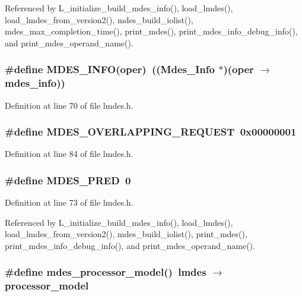 Referenced by L\_\-initialize\_\-build\_\-mdes\_\-info(), load\_\-lmdes(), load\_\-lmdes\_\-from\_\-version2(), mdes\_\-build\_\-iolist(), mdes\_\-max\_\-completion\_\-time(), print\_\-mdes(), print\_\-mdes\_\-info\_\-debug\_\-info(), and print\_\-mdes\_\-operand\_\-name().
\subsubsection{\setlength{\rightskip}{0pt plus 5cm}\#define MDES\_\-INFO(oper)~((\bf{Mdes\_\-Info} $\ast$)(oper $\rightarrow$ mdes\_\-info))}\label{lmdes_8h_c3fee9a9b81fcd259ac346ef74766f48}




Definition at line 70 of file lmdes.h.
\subsubsection{\setlength{\rightskip}{0pt plus 5cm}\#define MDES\_\-OVERLAPPING\_\-REQUEST~0x00000001}\label{lmdes_8h_66e95518415e6886ce1ea4fea1f11f2a}




Definition at line 84 of file lmdes.h.
\subsubsection{\setlength{\rightskip}{0pt plus 5cm}\#define MDES\_\-PRED~0}\label{lmdes_8h_af4ae62f6ecd434d7159ead2988d8382}




Definition at line 73 of file lmdes.h.

Referenced by L\_\-initialize\_\-build\_\-mdes\_\-info(), load\_\-lmdes(), load\_\-lmdes\_\-from\_\-version2(), mdes\_\-build\_\-iolist(), print\_\-mdes(), print\_\-mdes\_\-info\_\-debug\_\-info(), and print\_\-mdes\_\-operand\_\-name().
\subsubsection{\setlength{\rightskip}{0pt plus 5cm}\#define mdes\_\-processor\_\-model()~\bf{lmdes} $\rightarrow$ processor\_\-model}\label{lmdes_8h_1c2eedb335670f5aab26b0b7b9686296}




